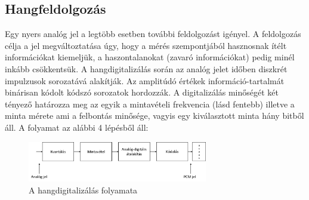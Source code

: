 \documentclass[a4paper,12pt]{paper}
\begin{document}
\subsection{Hangfeldolgozás}
Egy nyers analóg jel a legtöbb esetben további feldolgozást igényel. A feldolgozás célja a jel  megváltoztatása úgy, hogy a mérés szempontjából hasznosnak ítélt információkat kiemeljük, a haszontalanokat (zavaró információkat) pedig minél inkább csökkentsük. A hangdigitalizálás során az analóg jelet időben diszkrét impulzusok sorozatává alakítják. Az amplitúdó értékek információ-tartalmát binárisan kódolt kódszó sorozatok hordozzák. A digitalizálás minőségét két tényező határozza meg az egyik a mintavételi frekvencia (lásd fentebb) illetve a minta mérete ami a felbontás minősége, vagyis egy kiválasztott minta hány bitből áll. A folyamat az alábbi 4 lépésből áll: 

\begin{figure}[h]
	
	\centering
	\includegraphics[width=0.7\textwidth]{pcm}
	\caption{A hangdigitalizálás folyamata}
\end{figure}
\end{document}
